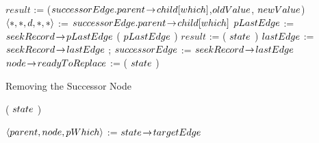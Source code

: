 \begin{limitscope}
\begin{algorithm}[htp]
{{			$result$ := \CAS($successorEdge.parent \!\rightarrow\! child[which]$,$oldValue$, $newValue$)\;
			$\langle  \ast, \ast, d, \ast, \ast  \rangle$ := $successorEdge.parent \!\rightarrow\! child[which]$\;
			$pLastEdge$ := $seekRecord \!\rightarrow\! pLastEdge$\;
			{
				 \HelpTargetNode( $pLastEdge$ )\;
			}			
      \BlankLine			
 	    $result$ := \FindSmallest( $state$ )\;
			$lastEdge$ := $seekRecord \!\rightarrow\! lastEdge$\;
			{
			   \Break;
			} 
			\lElse
			{
			   $successorEdge$ := $seekRecord \!\rightarrow\! lastEdge$
			}
   }
   \BlankLine
	 $node \!\rightarrow\! readyToReplace$ := \True\;
   \UpdateMode( $state$ )\;	
}
\caption{Removing the Successor Node}
\label{algo:icdcn-remove}
\end{algorithm}




\begin{algorithm}[htp]
\DefineKeyWords



\DontPrintSemicolon
\Boolean \Cleanup( $state$ )\;
\PrintSemicolon
\Begin
{
	
	
	 $\langle parent, node, pWhich \rangle$ := $state \!\rightarrow\! targetEdge$\;
	 
	
	 \BlankLine
	 
	 {
	  	   
}}
\end{algorithm}
\end{limitscope}
